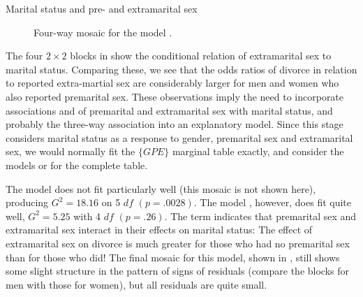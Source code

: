 \begin{Example}[marital1]{Marital status and pre- and extramarital sex}
\begin{figure}[htb]
\begin{minipage}[t]{.49\linewidth}
  \caption[Four-way mosaic for the model  ]{Four-way mosaic for the model  .} \label{fig:mosaic54}
 \end{minipage}
\end{figure}

The four \(2 \times  2\) blocks in  show the conditional
relation of extramarital sex to marital status.  Comparing these, we
see that the odds ratios of divorce in relation to reported
extra-martial sex are considerably larger for men and women who also
reported premarital sex.  These observations imply the need to
incorporate associations  and  of premarital and
extramarital sex with marital status, and probably the three-way association
 into an explanatory model.
Since this stage
considers marital status as a response to gender, premarital sex and
extramarital sex, we would normally fit the $\{GPE\}$ marginal
table exactly, and consider the models  or 
 for the complete table.

The model  does not fit particularly well
(this mosaic is not shown here),
producing \(G^2  =  18.16\) on 5 \(df\) \(( p  =  .0028 )\).
The model , however, does  fit quite well, \(G^2  =  5.25\)
with 4 \(df\) \(( p  =  .26 )\).
The term  indicates that premarital sex and extramarital
sex interact in their effects on marital status:
The effect of extramarital sex on divorce is much greater for those
who had no premarital sex than for those who did!
The final mosaic for this model, shown in ,
still shows some slight structure in the pattern of signs
of residuals (compare the blocks for men with those for women),
but all residuals are quite small.
\end{Example}